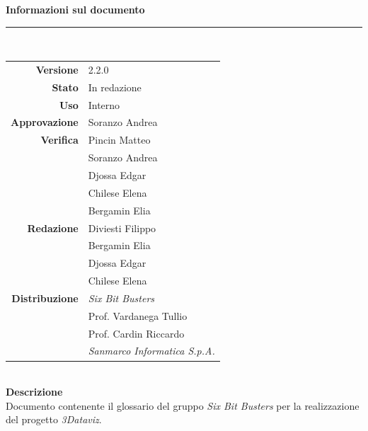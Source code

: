 \begin{titlepage}
\begin{center}
	\large \textbf{Informazioni sul documento} \\
	\rule{0.6\textwidth}{0.4pt}
	\\[0.5cm]
	\begin{tabular}{r|l}
		\textbf{Versione} & 2.2.0\\
		\textbf{Stato} & In redazione\\
		\textbf{Uso} & Interno\\                         
		\textbf{Approvazione} & Soranzo Andrea\\                      
		\textbf{Verifica} & Pincin Matteo \\ & Soranzo Andrea \\ & Djossa Edgar \\ & Chilese Elena\\ & Bergamin Elia\\                        
		\textbf{Redazione} & Diviesti Filippo\\ & Bergamin Elia \\ & Djossa Edgar\\ & Chilese Elena \\
		\textbf{Distribuzione} & \textit{Six Bit Busters} \\ & Prof. Vardanega Tullio \\ & Prof. Cardin Riccardo \\ & \textit{Sanmarco Informatica S.p.A.}
	\end{tabular}	
	\\[0.8cm]

	\large \textbf{Descrizione} \\
	Documento contenente il glossario del gruppo \textit{Six Bit Busters} per la realizzazione del progetto \textit{3Dataviz}.
	
	\end{center}
\end{titlepage}
